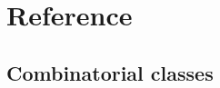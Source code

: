 \documentclass[letterpaper,10pt,english]{sphinxmanual}
\begin{document}
\begin{DUlineblock}{0em}
\item[] 
\end{DUlineblock}


\chapter{Reference}
\label{\detokenize{index:reference}}

\section{Combinatorial classes}
\label{\detokenize{index:id3}}
\begin{DUlineblock}{0em}
\item[] 
\end{DUlineblock}
\end{document}
